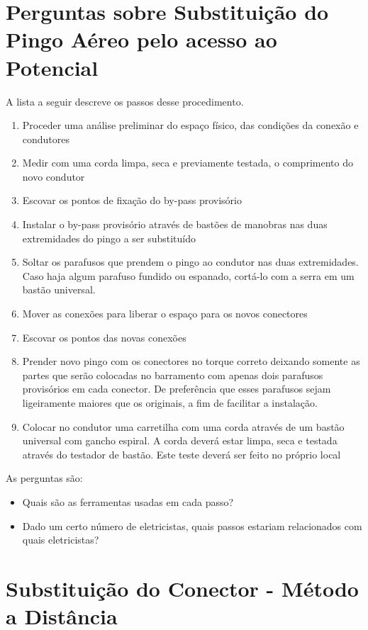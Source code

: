 \section{Perguntas sobre Substituição do Pingo Aéreo pelo acesso ao Potencial} 


A lista a seguir descreve os passos desse procedimento.
\begin{enumerate}
\item Proceder uma análise preliminar do espaço físico, das condições da conexão e condutores
\item Medir com uma corda limpa, seca e previamente testada, o comprimento do novo condutor
\item Escovar os pontos de fixação do by-pass provisório
\item Instalar o by-pass provisório através de bastões de manobras nas duas extremidades do pingo a ser substituído
\item Soltar os parafusos que prendem o pingo ao condutor nas duas extremidades. Caso haja algum parafuso fundido ou espanado, cortá-lo com a serra em um bastão universal.
\item Mover as conexões para liberar o espaço para os novos conectores
\item Escovar os pontos das novas conexões
\item Prender novo pingo com os conectores no torque correto deixando somente as partes que serão colocadas no barramento com apenas dois parafusos provisórios em cada conector. De preferência que esses parafusos sejam ligeiramente maiores que os originais, a fim de facilitar a instalação.
\item Colocar no condutor uma carretilha com uma corda através de um bastão universal com gancho espiral. A corda deverá estar limpa, seca e testada através do testador de bastão. Este teste deverá ser feito no próprio local
\end{enumerate}

As perguntas são:
\begin{itemize}
\item Quais são as ferramentas usadas em cada passo?
\item Dado um certo número de eletricistas, quais passos estariam relacionados com quais eletricistas? 
\end{itemize}


\section{Substituição do Conector - Método a Distância}

